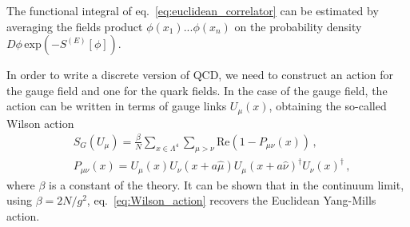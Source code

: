 The functional integral of eq.~\eqref{eq:euclidean_correlator} can be estimated
by averaging the fields product $\phi\left(x_1\right)...\phi\left(x_n\right)$ on the probability density 
$D\phi \, \text{exp}\left(-S^{(E)}\left[\phi\right]\right)$.


%
In order to write a discrete version of QCD, we need to construct an action for the gauge field and one for the quark fields.
In the case of the gauge field, the action can be written in terms of gauge links $U_{\mu}\left(x\right)$, obtaining the so-called Wilson action
\begin{align}
    \label{eq:Wilson_action}
    &S_G\left(U_{\mu}\right) = 
    \frac{\beta}{N}\sum_{x\in \Lambda^4}\sum_{\mu>\nu}\text{Re}\left(1-P_{\mu\nu}\left(x\right)\right)\,, \\
    &P_{\mu\nu}\left(x\right) = U_{\mu}\left(x\right)U_{\nu}\left(x+a\hat{\mu}\right)
    U_{\mu}\left(x+a\hat{\nu}\right)^{\dagger}U_{\nu}\left(x\right)^{\dagger}\,,
\end{align}
where $\beta$ is a constant of the theory. It can be shown that in the continuum limit,
using $\beta=2N/g^2$, eq.~\eqref{eq:Wilson_action}
recovers the Euclidean Yang-Mills action.

